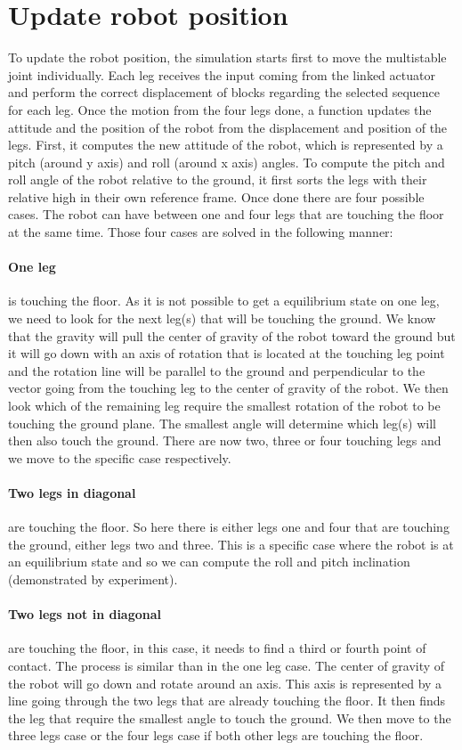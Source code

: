     \section{Update robot position}
        To update the robot position, the simulation starts first to move the multistable joint individually. Each leg receives the input coming from the linked actuator and perform the correct displacement of blocks regarding the selected sequence for each leg. Once the motion from the four legs done, a function updates the attitude and the position of the robot from the displacement and position of the legs.
        First, it computes the new attitude of the robot, which is represented by a pitch (around y axis) and roll (around x axis) angles. To compute the pitch and roll angle of the robot relative to the ground, it first sorts the legs with their relative high in their own reference frame. Once done there are four possible cases. The robot can have between one and four legs that are touching the floor at the same time. Those four cases are solved in the following manner:
            \paragraph{One leg} is touching the floor. As it is not possible to get a equilibrium state on one leg, we need to look for the next leg(s) that will be touching the ground. We know that the gravity will pull the center of gravity of the robot toward the ground but it will go down with an axis of rotation that is located at the touching leg point and the rotation line will be parallel to the ground and perpendicular to the vector going from the touching leg to the center of gravity of the robot. We then look which of the remaining leg require the smallest rotation of the robot to be touching the ground plane. The smallest angle will determine which leg(s) will then also touch the ground. There are now two, three or four touching legs and we move to the specific case respectively.
            \paragraph{Two legs in diagonal} are touching the floor. So here there is either legs one and four that are touching the ground, either legs two and three. This is a specific case where the robot is at an equilibrium state and so we can compute the roll and pitch inclination (demonstrated by experiment). 
            \paragraph{Two legs not in diagonal} are touching the floor, in this case, it needs to find a third or fourth point of contact. The process is similar than in the one leg case. The center of gravity of the robot will go down and rotate around an axis. This axis is represented by a line going through the two legs that are already touching the floor. It then finds the leg that require the smallest angle to touch the ground. We then move to the three legs case or the four legs case if both other legs are touching the floor. 
